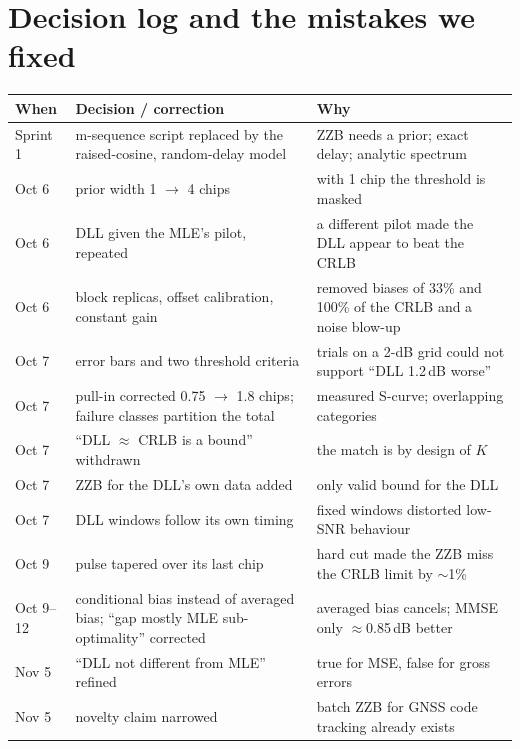 \documentclass[11pt,a4paper]{article}
\begin{document}
\section{Decision log and the mistakes we fixed}\label{sec:decisions}
\begin{center}
\begin{tabularx}{\textwidth}{>{\raggedright\arraybackslash}p{1.6cm}>{\raggedright\arraybackslash}X>{\raggedright\arraybackslash}X}
\toprule
\textbf{When} & \textbf{Decision / correction} & \textbf{Why}\\
\midrule
Sprint 1 & m-sequence script replaced by the raised-cosine, random-delay model & ZZB needs a prior; exact delay; analytic spectrum\\
Oct 6 & prior width 1 $\to$ 4 chips & with 1 chip the threshold is masked\\
Oct 6 & DLL given the MLE's pilot, repeated & a different pilot made the DLL appear to beat the CRLB\\
Oct 6 & block replicas, offset calibration, constant gain & removed biases of 33\% and 100\% of the CRLB and a noise blow-up\\
Oct 7 & error bars and two threshold criteria & 2000 trials on a 2-dB grid could not support ``DLL 1.2\,dB worse''\\
Oct 7 & pull-in corrected 0.75 $\to$ 1.8 chips; failure classes partition the total & measured S-curve; overlapping categories\\
Oct 7 & ``DLL $\approx$ CRLB is a bound'' withdrawn & the match is by design of $K$\\
Oct 7 & ZZB for the DLL's own data added & only valid bound for the DLL\\
Oct 7 & DLL windows follow its own timing & fixed windows distorted low-SNR behaviour\\
Oct 9 & pulse tapered over its last chip & hard cut made the ZZB miss the CRLB limit by $\sim$1\%\\
Oct 9--12 & conditional bias instead of averaged bias; ``gap mostly MLE sub-optimality'' corrected & averaged bias cancels; MMSE only $\approx$0.85\,dB better\\
Nov 5 & ``DLL not different from MLE'' refined & true for MSE, false for gross errors\\
Nov 5 & novelty claim narrowed & batch ZZB for GNSS code tracking already exists\\
\bottomrule
\end{tabularx}
\end{center}
\end{document}
